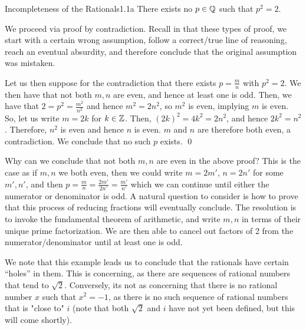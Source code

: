 \begin{example}{Incompleteness of the Rationals}{1.1a}
    There exists no $p \in \mathbb{Q}$ such that $p^2 = 2$.
\end{example}
\noindent We proceed via proof by contradiction. Recall in that these types of proof, we start with a certain wrong assumption, follow a correct/true line of reasoning, reach an eventual absurdity, and therefore conclude that the original assumption was mistaken. 
\begin{nproof}
    Let us then suppose for the contradiction that there exists $p = \frac{m}{n}$ with $p^2 = 2$. We then have that not both $m, n$ are even, and hence at least one is odd. Then, we have that $2 = p^2 = \frac{m^2}{n^2}$ and hence $m^2 = 2n^2$, so $m^2$ is even, implying $m$ is even. So, let us write $m = 2k$ for $k \in \mathbb{Z}$. Then, $(2k)^2 = 4k^2 = 2n^2$, and hence $2k^2 = n^2$. Therefore, $n^2$ is even and hence $n$ is even. $m$ and $n$ are therefore both even, a contradiction. We conclude that no such $p$ exists. \qed
\end{nproof}
\noindent Why can we conclude that not both $m, n$ are even in the above proof? This is the case as if $m, n$ we both even, then we could write $m = 2m'$, $n = 2n'$ for some $m', n'$, and then $p = \frac{m}{n} = \frac{2m'}{2n'} = \frac{m'}{n'}$ which we can continue until either the numerator or denominator is odd. A natural question to consider is how to prove that this process of reducing fractions will eventually conclude. The resolution is to invoke the fundamental theorem of arithmetic, and write $m, n$ in terms of their unique prime factorization. We are then able to cancel out factors of 2 from the numerator/denominator until at least one is odd.

We note that this example leads us to conclude that the rationals have certain ``holes'' in them. This is concerning, as there are sequences of rational numbers that tend to $\sqrt{2}$. Conversely, its not as concerning that there is no rational number $x$ such that $x^2 = -1$, as there is no such sequence of rational numbers that is "close to" $i$ (note that both $\sqrt{2}$ and $i$ have not yet been defined, but this will come shortly).

\setcounter{rudin}{0}

